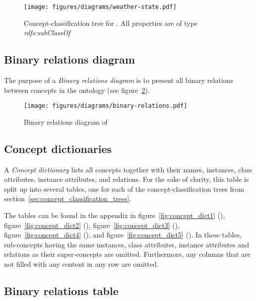 \begin{figure}
  \centering
  \texttt{[image: figures/diagrams/weather-state.pdf]}
  \caption{Concept-classification tree for . All properties are of type \emph{rdfs:subClassOf}}
  \label{fig:tree_weather_state}
\end{figure}

\subsection{Binary relations diagram}
\label{subsec:binary_relations_diagram}

The purpose of a \emph{Binary relations diagram} is to present all binary relations between concepts in the ontology (see figure~\ref{fig:binary_relations}).

\begin{figure}
  \centering
  \texttt{[image: figures/diagrams/binary-relations.pdf]}
  \caption{Binary relations diagram of \thinkhomeweather}
  \label{fig:binary_relations}
\end{figure}

\subsection{Concept dictionaries}
\label{subsec:concept_dictionaries}

A \emph{Concept dictionary} lists all concepts together with their names, instances, class attributes, instance attributes, and relations. For the sake of clarity, this table is split up into several tables, one for each of the concept-classification trees from section~\ref{sec:concept_classification_trees}.

The tables can be found in the appendix in figure~\ref{fig:concept_dict1} (), figure~\ref{fig:concept_dict2} (), figure~\ref{fig:concept_dict3} (), figure~\ref{fig:concept_dict4} (), and figure~\ref{fig:concept_dict5} (). In these tables, sub-concepts having the same instances, class attributes, instance attributes and relations as their super-concepts are omitted. Furthermore, any columns that are not filled with any content in any row are omitted.

\subsection{Binary relations table}
\label{subsec:binary_relations_table}

